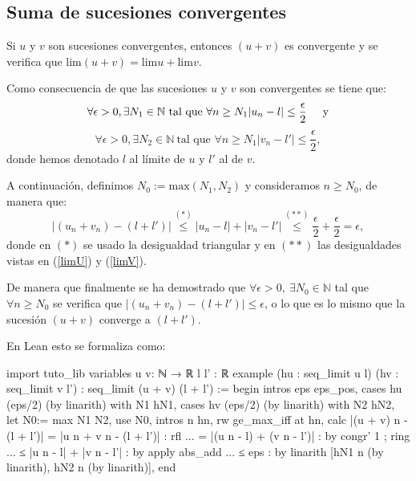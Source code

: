 \subsection{Suma de sucesiones convergentes}
\begin{teorema}
	Si \(u\) y \(v\) son sucesiones convergentes, entonces \( (u+v)\) es convergente y se verifica que \(\text{lim} (u+v)= \text{lim} u+ \text{lim} v\).
\end{teorema}
\begin{demostracion}
	Como consecuencia de que las sucesiones \(u\) y \(v\) son convergentes se tiene que:
	\begin{equation}\label{limU}
	\forall \epsilon >0, \exists N_1 \in \mathbb{N} \ \text{tal que }\forall n \geq N_1 |u_n-l| \leq \frac{\epsilon}{2} \hspace{0.5cm}\text{y}
	\end{equation}
	\begin{equation}\label{limV}
	\forall \epsilon >0, \exists N_2 \in \mathbb{N} \ \text{tal que }\forall n \geq N_1 |v_n-l'| \leq \frac{\epsilon}{2},
	\end{equation}
	donde hemos denotado \(l\) al límite de \(u\) y \(l'\) al de \(v\).
	
	A continuación, definimos \(N_0 := \text{max}(N_1,N_2)\) y consideramos \(n \geq N_0\), de manera que:
	\begin{equation*}
	|(u_n+v_n)-(l+l')| \stackrel{(*)}{\leq}|u_n-l|+|v_n-l'|\stackrel{(**)}{\leq} \frac{\epsilon}{2}+\frac{\epsilon}{2}=\epsilon,
	\end{equation*}
	donde en \((*)\) se usado la desigualdad triangular y en \((**)\) las desigualdades vistas en (\ref{limU}) y (\ref{limV}).
	
	De manera que finalmente se ha demostrado que \( \forall \epsilon >0, \ \exists N_0 \in \mathbb{N}\) tal que \( \forall n \geq N_0\) se verifica que \( | (u_n+v_n)-(l+l')| \leq \epsilon\), o lo que es lo mismo que la sucesión \((u+v)\) converge a \( (l+l')\).
\end{demostracion}

En Lean esto se formaliza como:
\begin{leancode}
import tuto_lib
variables {u v: ℕ → ℝ} {l l' : ℝ}
example (hu : seq_limit u l) (hv : seq_limit v l') :
seq_limit (u + v) (l + l') :=
begin
intros eps eps_pos,
cases hu (eps/2) (by linarith) with N1 hN1,
cases hv (eps/2) (by linarith) with N2 hN2,
let N0:= max N1 N2,
use N0,
intros n hn,
rw ge_max_iff at hn,
calc
|(u + v) n - (l + l')| = |u n + v n - (l + l')|   : rfl
... = |(u n - l) + (v n - l')| : by congr' 1 ; ring
... ≤ |u n - l| + |v n - l'|   : by apply abs_add
... ≤  eps                     : by linarith [hN1 n (by linarith),
 hN2 n (by linarith)],
end
\end{leancode}

